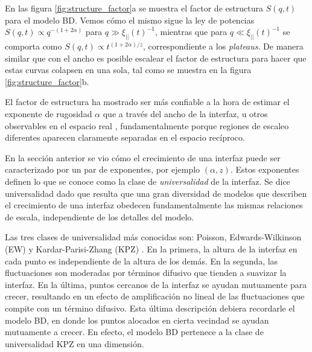 En las figura \ref{fig:structure_factor}a se muestra el factor de estructura $S(q,t)$ para el modelo BD. Vemos cómo el mismo sigue la ley de potencias 
$S(q,t) \propto q^{-(1+2\alpha)}$ para $q \gg \xi_{||}(t)^{-1}$, mientras que para $q \ll \xi_{||}(t)^{-1}$ se comporta como $S(q,t) \propto t^{(1+2\alpha)/z}$, correspondiente a los \textit{plateaus}. De manera similar que con el ancho es posible escalear el factor de estructura para hacer que estas curvas colapsen en una sola, tal como se muestra en la figura \ref{fig:structure_factor}b. 

El factor de estructura ha mostrado ser más confiable a la hora de estimar el exponente de rugosidad $\alpha$ que a través del ancho de la interfaz, u otros observables
en el espacio real \cite{Bustingorry}, fundamentalmente porque regiones de escaleo diferentes aparecen claramente separadas en el espacio recíproco.






En la sección anterior se vio cómo el crecimiento de una interfaz puede ser caracterizado por un par de exponentes, por ejemplo $(\alpha,z)$. Estos exponentes 
definen lo que se conoce como la clase de \textit{universalidad} de la interfaz. Se dice universalidad dado que resulta que una gran diversidad de modelos que describen el crecimiento de una interfaz obedecen fundamentalmente las mismas relaciones de escala, independiente de los detalles del modelo.

Las tres clases de universalidad más conocidas son: Poisson, Edwards-Wilkinson (EW) y Kardar-Parisi-Zhang (KPZ) \cite{Family_1986,PhysRevLett.56.889}. En la primera, 
la altura de la interfaz en cada punto es independiente de la altura de los demás. En la segunda, las fluctuaciones son moderadas por términos difusivo que tienden a 
suavizar la interfaz. En la última, puntos cercanos de la interfaz se ayudan mutuamente para crecer, resultando en un efecto de amplificación no lineal de las fluctuaciones que compite con un término difusivo. Esta última descripción debiera recordarle el modelo BD, en donde los puntos alocados en cierta vecindad se ayudan mutuamente a crecer. En efecto, el modelo BD pertenece a la clase de universalidad KPZ en una dimensión.

